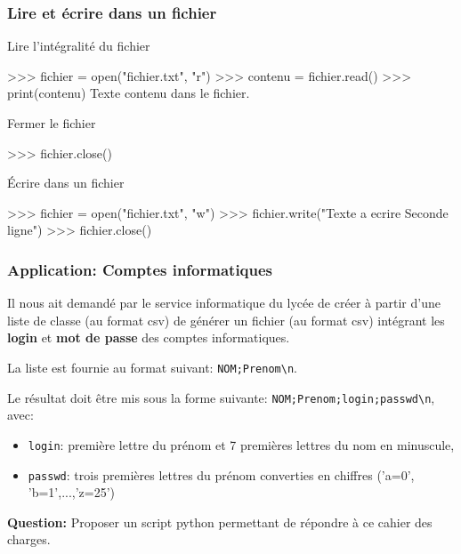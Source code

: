 \begin{frame}[fragile]
\frametitle{Lire et écrire dans un fichier}

\begin{minipage}[t]{0.38\linewidth}
Lire l'intégralité du fichier
\end{minipage}\hfill
\begin{minipage}[t]{0.58\linewidth}
\vspace{-0.5cm}
\begin{GrayBox}[0.85\textwidth]
\begin{verbatimtab}[3]
>>> fichier = open("fichier.txt", "r")
>>> contenu = fichier.read()
>>> print(contenu)
Texte contenu dans le fichier.
\end{verbatimtab}
\end{GrayBox}
\end{minipage}

\begin{minipage}[t]{0.38\linewidth}
Fermer le fichier
\end{minipage}\hfill
\begin{minipage}[t]{0.58\linewidth}
\vspace{-0.5cm}
\begin{GrayBox}[0.85\textwidth]
\begin{verbatimtab}[3]
>>> fichier.close()
\end{verbatimtab}
\end{GrayBox}
\end{minipage}

Écrire dans un fichier

\begin{GrayBox}[0.85\textwidth]
\begin{verbatimtab}[3]
>>> fichier = open("fichier.txt", "w")
>>> fichier.write("Texte a ecrire \n Seconde ligne")
>>> fichier.close()
\end{verbatimtab}
\end{GrayBox}
\end{frame}

\begin{frame}[fragile]
\frametitle{Application: Comptes informatiques}

Il nous ait demandé par le service informatique du lycée de créer à partir d'une liste de classe (au format csv) de générer un fichier (au format csv) intégrant les \textbf{login} et \textbf{mot de passe} des comptes informatiques.

La liste est fournie au format suivant: \verb?NOM;Prenom\n?.

Le résultat doit être mis sous la forme suivante: \verb?NOM;Prenom;login;passwd\n?, avec:
\begin{itemize}
 \item \verb?login?: première lettre du prénom et 7 premières lettres du nom en minuscule,
 \item \verb?passwd?: trois premières lettres du prénom converties en chiffres ('a=0', 'b=1',...,'z=25')
\end{itemize}

\textbf{Question:} Proposer un script python permettant de répondre à ce cahier des charges.

\end{frame}


